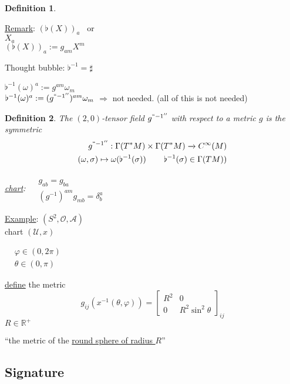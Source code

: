 \documentclass[10pt, twoside]{amsart}
\newtheorem{definition}{Definition}
\begin{document}
\begin{multicols*}{2}
\begin{definition}
\begin{enumerate}
\end{enumerate}
\end{definition}

\underline{Remark}: $(\flat(X))_a$ \quad \, or \\
$X_a$ \\
$(\flat(X))_a := g_{am} X^m$

Thought bubble: $\flat^{-1} = \sharp$

$\flat^{-1}(\omega)^a := g^{am}\omega_m$ \\
$\flat^{-1}(\omega)^a := (g^{``-1''})^{am}\omega_m$
$\Longrightarrow $ not needed.  (all of this is not needed)

\begin{definition}
  The $(2,0)$-tensor field $g^{``-1''}$ with respect to a metric $g$ is the symmetric
\[
\begin{aligned}
  g^{``-1''} : \Gamma(T^*M) \times \Gamma(T^*M) \xrightarrow{ ~ } C^{\infty}(M) \\
  (\omega, \sigma) \mapsto \omega( \flat^{-1}(\sigma)) \quad \quad \, \flat^{-1}(\sigma) \in \Gamma(TM))
\end{aligned}
\]

\underline{chart}: $\begin{aligned} & \quad \\ 
  & g_{ab} = g_{ba} \\
  & (g^{-1})^{am} g_{mb} = \delta^a_b \end{aligned}$


\end{definition}

\underline{Example}: $(S^2, \mathcal{O}, \mathcal{A})$ \\ 
\phantom{example } chart $(\mathcal{U}, x)$

$\begin{aligned} 
 & \varphi \in (0,2\pi ) \\ 
  & \theta \in (0,\pi)\end{aligned}$

\underline{define} the metric
\[
g_{ij}(x^{-1}(\theta,\varphi)) = \left[ \begin{matrix} R^2 & 0 \\
    0 & R^2\sin^2{\theta} \end{matrix} \right]_{ij}
\]
$R \in \mathbb{R}^+$

``the metric of the \underline{round sphere of radius $R$}''

\subsection{Signature} 


\end{multicols*}
\end{document}
